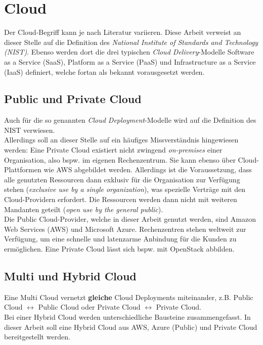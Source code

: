\section{Cloud}\label{cloud}
Der Cloud-Begriff kann je nach Literatur variieren. Diese Arbeit verweist an dieser Stelle auf die Definition des \textit{National Institute of Standards and Technology (NIST)}. Ebenso werden dort die drei typischen \textit{Cloud Delivery}-Modelle Software as a Service (SaaS), Platform as a Service (PaaS) und Infrastructure as a Service (IaaS) definiert, welche fortan als bekannt vorausgesetzt werden.\cite{mell2011}

\subsection{Public und Private Cloud}
Auch für die so genannten \textit{Cloud \gls{Deployment}}-Modelle wird auf die Definition des NIST verwiesen.\cite{mell2011}\\
Allerdings soll an dieser Stelle auf ein häufiges Missverständnis hingewiesen werden: Eine Private Cloud existiert nicht zwingend \textit{\gls{on-premises}} einer Organisation, also bspw. im eigenen Rechenzentrum. Sie kann ebenso über Cloud-Plattformen wie AWS abgebildet werden. Allerdings ist die Voraussetzung, dass alle genutzten Ressourcen dann exklusiv für die Organisation zur Verfügung stehen (\textit{exclusive use by a single organization}), was spezielle Verträge mit den Cloud-Providern erfordert. Die Ressourcen werden dann nicht mit weiteren Mandanten geteilt (\textit{open use by the general public}).\\
Die Public Cloud-Provider, welche in dieser Arbeit genutzt werden, sind Amazon Web Services (AWS) und Microsoft Azure. Rechenzentren stehen weltweit zur Verfügung, um eine schnelle und latenzarme Anbindung für die Kunden zu ermöglichen. Eine Private Cloud lässt sich bspw. mit OpenStack abbilden\cite{sefraoui2012openstack}.

\subsection{Multi und Hybrid Cloud}
Eine Multi Cloud vernetzt \textbf{gleiche} Cloud \gls{Deployment}s miteinander, z.B. Public Cloud 	$\leftrightarrow$ Public Cloud oder Private Cloud $\leftrightarrow$ Private Cloud.\\
Bei einer Hybrid Cloud werden unterschiedliche Bausteine zusammengefasst. In dieser Arbeit soll eine Hybrid Cloud aus AWS, Azure (Public) und Private Cloud bereitgestellt werden.

